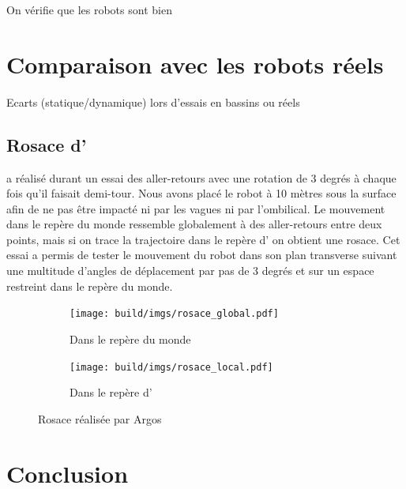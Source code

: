 			On vérifie que les robots sont bien 

	\section{Comparaison avec les robots réels}

		Ecarts (statique/dynamique) lors d'essais en bassins ou réels

		\subsection{Rosace d'\argos{}}

			\argos{} a réalisé durant un essai des aller-retours avec une rotation de 3 degrés à chaque fois qu'il faisait demi-tour. Nous avons placé le robot à 10 mètres sous la surface afin de ne pas être impacté ni par les vagues ni par l'ombilical. Le mouvement dans le repère du monde ressemble globalement à des aller-retours entre deux points, mais si on trace la trajectoire dans le repère d'\argos{} on obtient une rosace. Cet essai a permis de tester le mouvement du robot dans son plan transverse suivant une multitude d'angles de déplacement par pas de 3 degrés et sur un espace restreint dans le repère du monde.

			\begin{figure}[!htb]
				\centering
				\begin{subfigure}[t]{0.48\textwidth}
					\centering
					\texttt{[image: build/imgs/rosace\_global.pdf]}
					\caption{Dans le repère du monde}
				\end{subfigure}
				\hfill
				\begin{subfigure}[t]{0.48\textwidth}
					\centering
					\texttt{[image: build/imgs/rosace\_local.pdf]}
					\caption{Dans le repère d'\argos{}}
				\end{subfigure}
				\caption{Rosace réalisée par Argos}
				\label{fig:rosace_argos}
			\end{figure}

	\section{Conclusion}